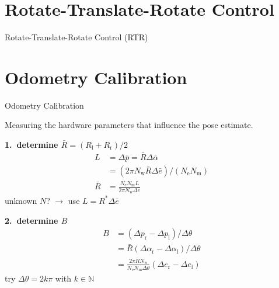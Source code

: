 \documentclass{beamer}
\begin{document}
\section{Rotate-Translate-Rotate Control}
\begin{frame}{Rotate-Translate-Rotate Control (RTR)}
    
  \centering
  \def\svgwidth{\columnwidth}
  
  
\end{frame}


\section{Odometry Calibration}
\begin{frame}{Odometry Calibration}
  
  Measuring the hardware parameters that influence the pose estimate.
  
  \vspace{2mm}
  
  \centering
  
  \vspace{2mm}
  
  \begin{minipage}[t]{0.45\columnwidth}
    \textbf{1.\ determine $\bar{R} = (R_\text{l}+R_\text{r})/2$}
    \begin{align*}
      L
      &=
      \Delta\bar{p} = \bar{R} \Delta\bar{\alpha}
      \\
      &=
      (2 \pi N_\text{w} \bar{R} \Delta{\bar{e}}) / (N_\text{e} N_\text{m})
      \\
      \bar{R}
      &=
      \frac{N_\text{e} N_\text{m} L}{2\pi N_\text{w} \Delta\bar{e}}
    \end{align*}
    unknown $N$? $\rightarrow$ use $L = R^\ast\Delta{\bar{e}}$
  \end{minipage}
  \hfill
  \begin{minipage}[t]{0.45\columnwidth}
    \textbf{2.\ determine $B$}
    \begin{align*}
      B
      &=
      (\Delta p_\text{r} - \Delta p_\text{l}) / \Delta\theta
      \\
      &=
      \bar{R}(\Delta\alpha_\text{r} - \Delta\alpha_\text{l}) / \Delta\theta
      \\
      &=
      \frac{2\pi\bar{R}N_\text{w}}{N_\text{e}N_\text{m} \Delta\theta} (\Delta e_\text{r} - \Delta e_\text{l})
    \end{align*}
    try $\Delta\theta = 2k\pi$ with $k\in\mathbb{N}$
  \end{minipage}
    

\end{frame}
\end{document}
